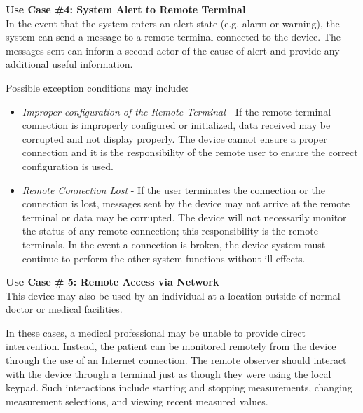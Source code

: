 \documentclass[12pt]{article} %
\begin{document}
\textbf{Use Case \#4: System Alert to Remote Terminal}\\
In the event that the system enters an alert state (e.g. alarm or warning), the
system can send a message to a remote terminal connected to the device. The
messages sent can inform a second actor of the cause of alert and provide any
additional useful information.

Possible exception conditions may include:
\begin{itemize}
  \item \emph{Improper configuration of the Remote Terminal} - If the remote
    terminal connection is improperly configured or initialized, data received
    may be corrupted and not display properly. The device cannot ensure a
    proper connection and it is the responsibility of the remote user to ensure
    the correct configuration is used.
  \item \emph{Remote Connection Lost} - If the user terminates the connection
    or the connection is lost, messages sent by the device may not arrive at
    the remote terminal or data may be corrupted. The device will not
    necessarily monitor the status of any remote connection; this
    responsibility is the remote terminals. In the event a connection is
    broken, the device system must continue to perform the other system
    functions without ill effects.
\end{itemize}

\textbf{Use Case \# 5: Remote Access via Network} \\
This device may also be used by an individual at a location outside of normal
doctor or medical facilities.

In these cases, a medical professional may be unable to provide direct
intervention. Instead, the patient can be monitored remotely from the device
through the use of an Internet connection. The remote observer should interact
with the device through a terminal just as though they were using the local
keypad. Such interactions include starting and stopping measurements, changing
measurement selections, and viewing recent measured values.
\end{document}
